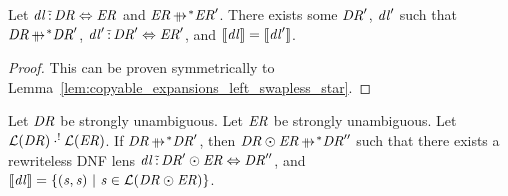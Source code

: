 \documentclass[numbers,10pt,preprint\ifanon ,nocopyrightspace\fi]{sigplanconf}
\begin{document}
\begin{lemma}
  \label{lem:copyable_expansions_right_swapless_star}
  Let $\mathit{dl} \,\tilde{:}\, \mathit{DR} \Leftrightarrow
  \mathit{ER}$ and $\DNFRegexAlt \StarOf{\ParallelRewrite} \DNFRegexAlt'$.
  There exists some
  $\mathit{DR}'$, $\mathit{dl}'$ such that $\DNFRegex
  \StarOf{\ParallelRewrite} \DNFRegex'$,
  $\mathit{dl}' \,\tilde{:}\,
  \mathit{DR}' \Leftrightarrow \mathit{ER}'$, and $[ \! [\mathit{dl}] \! ] =
  [ \! [\mathit{dl}'] \! ]$.
\end{lemma}
\begin{proof}
  This can be proven symmetrically to
  Lemma~\ref{lem:copyable_expansions_left_swapless_star}.
\end{proof}

\begin{lemma}
  \label{lem:star-parallel-rewrite-concatenation-to-identity-left}
  Let $\mathit{DR}$ be strongly unambiguous.  Let $\mathit{ER}$ be strongly
  unambiguous.
  Let $\mathcal{L}(\mathit{DR}) \cdot^! \mathcal{L}(\mathit{ER})$.
  If $\DNFRegex \StarOf{\ParallelRewrite} \DNFRegex'$, then
  $\DNFRegex \ConcatDNF \DNFRegexAlt \StarOf{\ParallelRewrite} \DNFRegex''$ such that there
  exists a rewriteless DNF lens
  $\mathit{dl} \,\tilde{:}\,
  \mathit{DR}' \odot \mathit{ER} \Leftrightarrow \mathit{DR}''$, and
  $[ \! [\mathit{dl}] \! ] =
  \{(\mathit{s},\mathit{s}) ~|~ \mathit{s} \in
    \mathcal{L}(\mathit{DR} \odot \mathit{ER})\}$.
\end{lemma}
\end{document}
